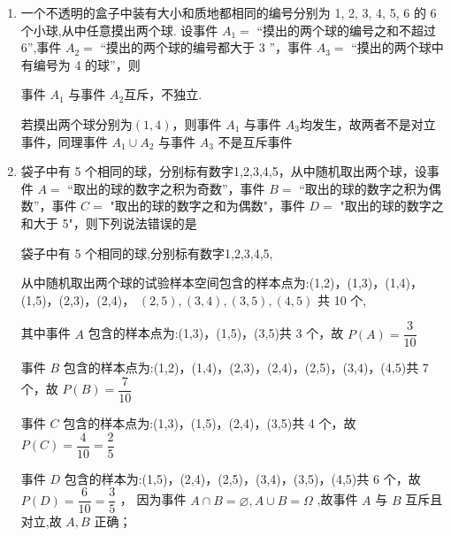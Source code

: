 \begin{enumerate}
\begin{enumerate}
        \item 一个不透明的盒子中装有大小和质地都相同的编号分别为 1, 2, 3, 4, 5, 6 的 6 个小球,从中任意摸出两个球. 设事件 ${A}_{1} =$ “摸出的两个球的编号之和不超过 6”,事件 ${A}_{2} =$ “摸出的两个球的编号都大于 3 ”，事件 ${A}_{3} =$ “摸出的两个球中有编号为 4 的球”，则
        \begin{jieda}
            事件 ${A}_{1}$ 与事件 ${A}_{2}$互斥，不独立.

            若摸出两个球分别为$(1,4)$，则事件 ${A}_{1}$ 与事件 ${A}_{3}$均发生，故两者不是对立事件，同理事件 ${A}_{1} \cup  {A}_{2}$ 与事件 ${A}_{3}$ 不是互斥事件
        \end{jieda}
        
        \item 袋子中有 5 个相同的球，分别标有数字1,2,3,4,5，从中随机取出两个球，设事件 $A =$ “取出的球的数字之积为奇数”，事件 $B =$ “取出的球的数字之积为偶数”，事件 $C =$ "取出的球的数字之和为偶数"，事件 $D =$ "取出的球的数字之和大于 5"，则下列说法错误的是
        \begin{jieda}
            袋子中有 5 个相同的球,分别标有数字1,2,3,4,5,
            
            从中随机取出两个球的试验样本空间包含的样本点为:(1,2)，(1,3)，(1,4)，(1,5)，(2,3)，(2,4)， $\left( {2,5}\right) ,\left( {3,4}\right) ,\left( {3,5}\right) ,\left( {4,5}\right)$ 共 10 个,
            
            其中事件 $A$ 包含的样本点为:(1,3)，(1,5)，(3,5)共 3 个，故 $P\left( A\right)  = \dfrac{3}{10}$
            
            事件 $B$ 包含的样本点为:(1,2)，(1,4)，(2,3)，(2,4)，(2,5)，(3,4)，(4,5)共 7 个，故 $P\left( B\right)  = \dfrac{7}{10}$
            
            事件 $C$ 包含的样本点为:(1,3)，(1,5)，(2,4)，(3,5)共 4 个，故 $P\left( C\right)  = \dfrac{4}{10} = \dfrac{2}{5}$
            
            事件 $D$ 包含的样本为:(1,5)，(2,4)，(2,5)，(3,4)，(3,5)，(4,5)共 6 个，故 $P\left( D\right)  = \dfrac{6}{10} = \dfrac{3}{5}$ ， 因为事件 $A \cap  B = \varnothing ,A \cup  B = \Omega$ ,故事件 $A$ 与 $B$ 互斥且对立,故 ${A},{B}$ 正确；
            

\end{jieda}
\end{enumerate}
\end{enumerate}
